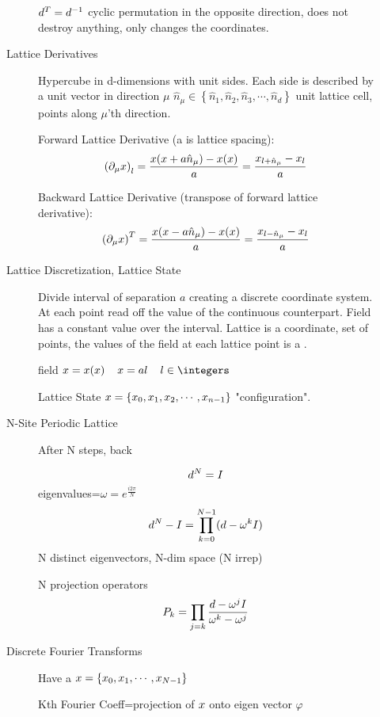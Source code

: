 \begin{description}
\begin{description}
$d^T=d^{-1}$ cyclic permutation in the opposite direction, does not destroy anything, only changes the coordinates.

\item[Lattice Derivatives]

Hypercube in d-dimensions with unit sides. Each side is described by a unit vector in direction $\mu$ $\hat{n}_{\mu}\in\left\lbrace \hat{n}_1,\hat{n}_2,\hat{n}_3,\cdots,\hat{n}_d\right\rbrace$ unit lattice cell, points along $\mu$'th direction.

Forward Lattice Derivative (a is lattice spacing):
$$\left(\partial_{\mu}x\right)_l=\frac{x(x+a\hat{n}_{\mu})-x(x)}{a}=\frac{x_{l+\hat{n}_{\mu}}-x_l}{a}$$

Backward Lattice Derivative (transpose of forward lattice derivative):
$$\left(\partial_{\mu}x\right)^T=\frac{x(x-a\hat{n}_{\mu})-x(x)}{a}=\frac{x_{l-\hat{n}_{\mu}}-x_l}{a}$$

\item[Lattice Discretization, Lattice State]

Divide interval of separation $a$ creating a discrete coordinate system. At each point read off the value of the continuous counterpart. Field has a constant value over the interval. Lattice is a coordinate, set of points, the values of the field at each lattice point is a {\lattstate}.

field $\ssp=\ssp(x)\hspace{4mm}x=al\hspace{4mm}l\in\integers$

Lattice State $x=\left\lbrace x_0,x_1,x_2,\cdots,x_{n-1}\right\rbrace$ "configuration".

\item[N-Site Periodic Lattice]

After N steps, back

$$d^N=I$$
eigenvalues=$\omega=e^{\frac{i2\pi}{N}}$
$$d^N-I=\prod_{k=0}^{N-1}(d-\omega^kI)$$
N distinct eigenvectors, N-dim space (N irrep)

N projection operators
$$P_k=\prod_{j=k}\frac{d-\omega^jI}{\omega^k-\omega^j}$$

\item[Discrete Fourier Transforms]

Have a {\lattstate} $x=\left\lbrace x_0,x_1,\cdots,x_{N-1} \right\rbrace$

Kth Fourier Coeff=projection of $x$ onto eigen vector $\varphi$


\end{description}
\end{description}
